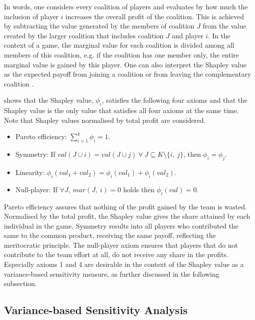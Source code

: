 In words, one considers every coalition of players and evaluates by how much the inclusion of player $i$ increases the overall profit of the coalition. This is achieved by subtracting the value generated by the members of coalition $J$ from the value created by the larger coalition that includes coalition $J$ and player $i$. In the context of a game, the marginal value for each coalition is divided among all members of this coalition, e.g. if the coalition has one member only, the entire marginal value is gained by this player. One can also interpret the Shapley value as the expected payoff from joining a coalition or from leaving the complementary coalition \citep{PRB20}.

\citet{S53} shows that the Shapley value, $\phi_i$, satisfies the following four axioms and that the Shapley value is the only value that satisfies all four axioms at the same time. Note that Shapley values normalised by total profit are considered.

\begin{itemize}
    \item Pareto efficiency: $\sum_{i=1}^{k}\phi_i=1$.
	\item Symmetry: If $val(J \cup {i})=val(J \cup {j})\ \forall\ J \subseteq K \setminus{\{i,\ j\}}$, then $\phi_i = \phi_j$.
	\item Linearity: $\phi_i(val_1 + val_2)=\phi_i(val_1)+\phi_i(val_2)$.
	\item Null-player: If $\forall J,\ mar(J,\ i) = 0$ holds then $\phi_i(val) = 0$.
\end{itemize}

Pareto efficiency assures that nothing of the profit gained by the team is wasted. Normalised by the total profit, the Shapley value gives the share attained by each individual in the game. Symmetry results into all players who contributed the same to the common product, receiving the same payoff, reflecting the meritocratic principle. The null-player axiom ensures that players that do not contribute to the team effort at all, do not receive any share in the profits. Especially axioms 1 and 4 are desirable in the context of the Shapley value as a variance-based sensitivity measure, as further discussed in the following subsection.

\subsection{Variance-based Sensitivity Analysis} \label{var_based_sa}

